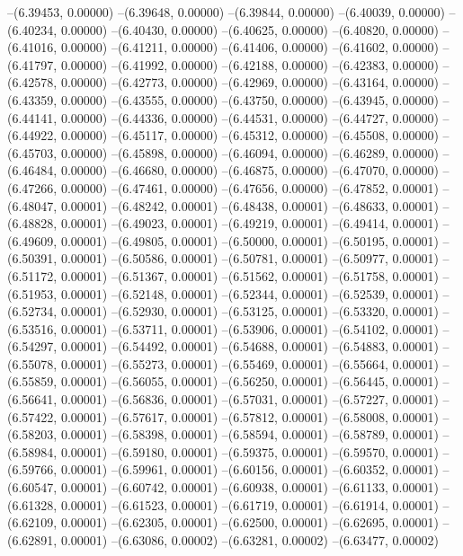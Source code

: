 --(6.39453, 0.00000)
--(6.39648, 0.00000)
--(6.39844, 0.00000)
--(6.40039, 0.00000)
--(6.40234, 0.00000)
--(6.40430, 0.00000)
--(6.40625, 0.00000)
--(6.40820, 0.00000)
--(6.41016, 0.00000)
--(6.41211, 0.00000)
--(6.41406, 0.00000)
--(6.41602, 0.00000)
--(6.41797, 0.00000)
--(6.41992, 0.00000)
--(6.42188, 0.00000)
--(6.42383, 0.00000)
--(6.42578, 0.00000)
--(6.42773, 0.00000)
--(6.42969, 0.00000)
--(6.43164, 0.00000)
--(6.43359, 0.00000)
--(6.43555, 0.00000)
--(6.43750, 0.00000)
--(6.43945, 0.00000)
--(6.44141, 0.00000)
--(6.44336, 0.00000)
--(6.44531, 0.00000)
--(6.44727, 0.00000)
--(6.44922, 0.00000)
--(6.45117, 0.00000)
--(6.45312, 0.00000)
--(6.45508, 0.00000)
--(6.45703, 0.00000)
--(6.45898, 0.00000)
--(6.46094, 0.00000)
--(6.46289, 0.00000)
--(6.46484, 0.00000)
--(6.46680, 0.00000)
--(6.46875, 0.00000)
--(6.47070, 0.00000)
--(6.47266, 0.00000)
--(6.47461, 0.00000)
--(6.47656, 0.00000)
--(6.47852, 0.00001)
--(6.48047, 0.00001)
--(6.48242, 0.00001)
--(6.48438, 0.00001)
--(6.48633, 0.00001)
--(6.48828, 0.00001)
--(6.49023, 0.00001)
--(6.49219, 0.00001)
--(6.49414, 0.00001)
--(6.49609, 0.00001)
--(6.49805, 0.00001)
--(6.50000, 0.00001)
--(6.50195, 0.00001)
--(6.50391, 0.00001)
--(6.50586, 0.00001)
--(6.50781, 0.00001)
--(6.50977, 0.00001)
--(6.51172, 0.00001)
--(6.51367, 0.00001)
--(6.51562, 0.00001)
--(6.51758, 0.00001)
--(6.51953, 0.00001)
--(6.52148, 0.00001)
--(6.52344, 0.00001)
--(6.52539, 0.00001)
--(6.52734, 0.00001)
--(6.52930, 0.00001)
--(6.53125, 0.00001)
--(6.53320, 0.00001)
--(6.53516, 0.00001)
--(6.53711, 0.00001)
--(6.53906, 0.00001)
--(6.54102, 0.00001)
--(6.54297, 0.00001)
--(6.54492, 0.00001)
--(6.54688, 0.00001)
--(6.54883, 0.00001)
--(6.55078, 0.00001)
--(6.55273, 0.00001)
--(6.55469, 0.00001)
--(6.55664, 0.00001)
--(6.55859, 0.00001)
--(6.56055, 0.00001)
--(6.56250, 0.00001)
--(6.56445, 0.00001)
--(6.56641, 0.00001)
--(6.56836, 0.00001)
--(6.57031, 0.00001)
--(6.57227, 0.00001)
--(6.57422, 0.00001)
--(6.57617, 0.00001)
--(6.57812, 0.00001)
--(6.58008, 0.00001)
--(6.58203, 0.00001)
--(6.58398, 0.00001)
--(6.58594, 0.00001)
--(6.58789, 0.00001)
--(6.58984, 0.00001)
--(6.59180, 0.00001)
--(6.59375, 0.00001)
--(6.59570, 0.00001)
--(6.59766, 0.00001)
--(6.59961, 0.00001)
--(6.60156, 0.00001)
--(6.60352, 0.00001)
--(6.60547, 0.00001)
--(6.60742, 0.00001)
--(6.60938, 0.00001)
--(6.61133, 0.00001)
--(6.61328, 0.00001)
--(6.61523, 0.00001)
--(6.61719, 0.00001)
--(6.61914, 0.00001)
--(6.62109, 0.00001)
--(6.62305, 0.00001)
--(6.62500, 0.00001)
--(6.62695, 0.00001)
--(6.62891, 0.00001)
--(6.63086, 0.00002)
--(6.63281, 0.00002)
--(6.63477, 0.00002)

